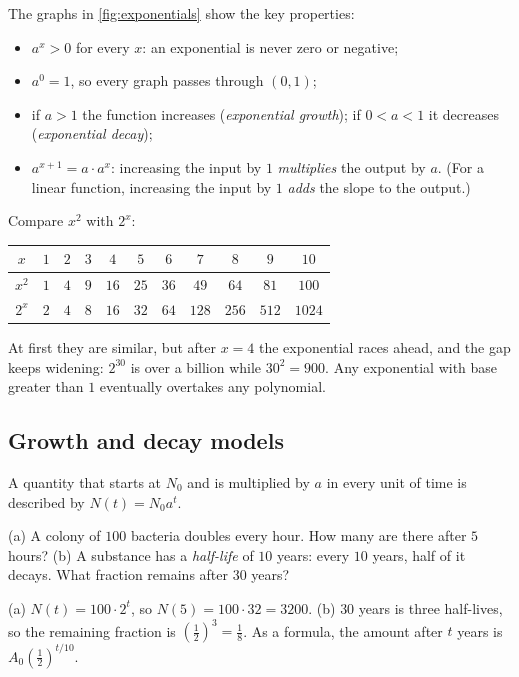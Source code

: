 The graphs in \cref{fig:exponentials} show the key properties:
\begin{itemize}
  \item $a^x > 0$ for every $x$: an exponential is never zero or negative;
  \item $a^0 = 1$, so every graph passes through $(0, 1)$;
  \item if $a > 1$ the function increases (\emph{exponential growth}); if
    $0 < a < 1$ it decreases (\emph{exponential decay});
  \item $a^{x + 1} = a \cdot a^x$: increasing the input by $1$
    \emph{multiplies} the output by $a$. (For a linear function, increasing the
    input by $1$ \emph{adds} the slope to the output.)
\end{itemize}

\begin{intuition}
Compare $x^2$ with $2^x$:
\begin{center}
\begin{tabular}{c|cccccccccc}
$x$ & $1$ & $2$ & $3$ & $4$ & $5$ & $6$ & $7$ & $8$ & $9$ & $10$\\
\hline
$x^2$ & $1$ & $4$ & $9$ & $16$ & $25$ & $36$ & $49$ & $64$ & $81$ & $100$\\
$2^x$ & $2$ & $4$ & $8$ & $16$ & $32$ & $64$ & $128$ & $256$ & $512$ & $1024$
\end{tabular}
\end{center}
At first they are similar, but after $x = 4$ the exponential races ahead, and
the gap keeps widening: $2^{30}$ is over a billion while $30^2 = 900$. Any
exponential with base greater than $1$ eventually overtakes any polynomial.
\end{intuition}

\subsection{Growth and decay models}

A quantity that starts at $N_0$ and is multiplied by $a$ in every unit of time
is described by $N(t) = N_0 a^t$.

\begin{example}
(a) A colony of $100$ bacteria doubles every hour. How many are there after
$5$ hours? (b) A substance has a \emph{half-life} of $10$ years: every $10$
years, half of it decays. What fraction remains after $30$ years?

\sol (a) $N(t) = 100 \cdot 2^t$, so $N(5) = 100 \cdot 32 = 3200$.
(b) $30$ years is three half-lives, so the remaining fraction is
$\left(\tfrac12\right)^3 = \tfrac18$. As a formula, the amount after $t$ years
is $A_0 \left(\tfrac12\right)^{t/10}$.
\end{example}


